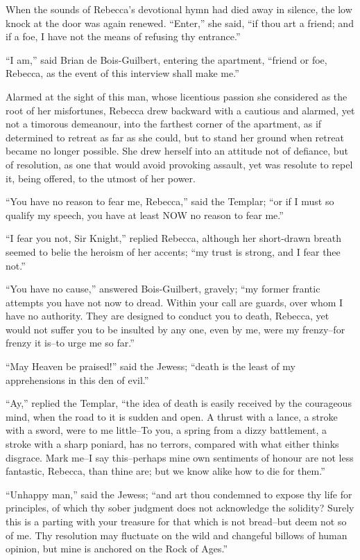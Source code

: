 When the sounds of Rebecca's devotional hymn had died away in silence,
the low knock at the door was again renewed. ``Enter,'' she said, ``if
thou art a friend; and if a foe, I have not the means of refusing thy
entrance.''

``I am,'' said Brian de Bois-Guilbert, entering the apartment, ``friend
or foe, Rebecca, as the event of this interview shall make me.''

Alarmed at the sight of this man, whose licentious passion she
considered as the root of her misfortunes, Rebecca drew backward with a
cautious and alarmed, yet not a timorous demeanour, into the farthest
corner of the apartment, as if determined to retreat as far as she
could, but to stand her ground when retreat became no longer possible.
She drew herself into an attitude not of defiance, but of resolution, as
one that would avoid provoking assault, yet was resolute to repel it,
being offered, to the utmost of her power.

``You have no reason to fear me, Rebecca,'' said the Templar; ``or if I
must so qualify my speech, you have at least NOW no reason to fear me.''

``I fear you not, Sir Knight,'' replied Rebecca, although her
short-drawn breath seemed to belie the heroism of her accents; ``my
trust is strong, and I fear thee not.''

``You have no cause,'' answered Bois-Guilbert, gravely; ``my former
frantic attempts you have not now to dread. Within your call are guards,
over whom I have no authority. They are designed to conduct you to
death, Rebecca, yet would not suffer you to be insulted by any one, even
by me, were my frenzy--for frenzy it is--to urge me so far.''

``May Heaven be praised!'' said the Jewess; ``death is the least of my
apprehensions in this den of evil.''

``Ay,'' replied the Templar, ``the idea of death is easily received by
the courageous mind, when the road to it is sudden and open. A thrust
with a lance, a stroke with a sword, were to me little--To you, a spring
from a dizzy battlement, a stroke with a sharp poniard, has no terrors,
compared with what either thinks disgrace. Mark me--I say this--perhaps
mine own sentiments of honour are not less fantastic, Rebecca, than
thine are; but we know alike how to die for them.''

``Unhappy man,'' said the Jewess; ``and art thou condemned to expose thy
life for principles, of which thy sober judgment does not acknowledge
the solidity? Surely this is a parting with your treasure for that which
is not bread--but deem not so of me. Thy resolution may fluctuate on the
wild and changeful billows of human opinion, but mine is anchored on the
Rock of Ages.''

